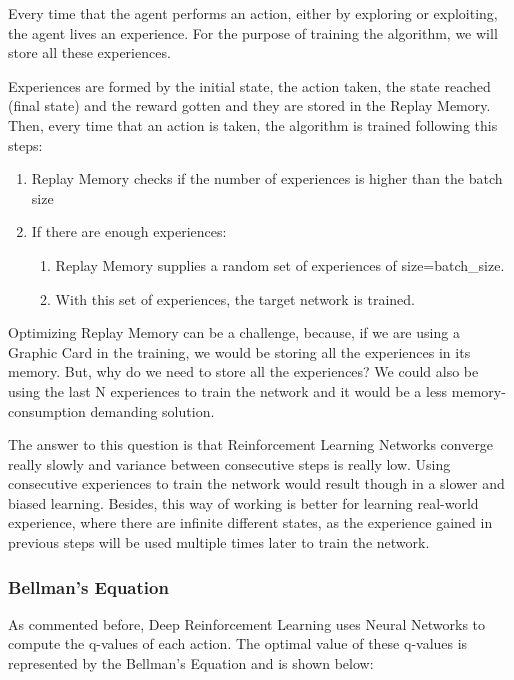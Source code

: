 			Every time that the agent performs an action, either by exploring or exploiting, the agent lives an experience. For the purpose of training the algorithm, we will store all these experiences.
			
			Experiences are formed by the initial state, the action taken, the state reached (final state) and the reward gotten and they are stored in the Replay Memory. Then, every time that an action is taken, the algorithm is trained following this steps:
			
			\begin{enumerate}
				\item Replay Memory checks if the number of experiences is higher than the batch size
				\item If there are enough experiences:
				\begin{enumerate}
					\item Replay Memory supplies a random set of experiences of size=batch\_size.
					\item With this set of experiences, the target network is trained.
				\end{enumerate}
			\end{enumerate}
			
			Optimizing Replay Memory can be a challenge, because, if we are using a Graphic Card in the training, we would be storing all the experiences in its memory. But, why do we need to store all the experiences? We could also be using the last N experiences to train the network and it would be a less memory-consumption demanding solution. 
			
			The answer to this question is that Reinforcement Learning Networks converge really slowly and variance between consecutive steps is really low. Using consecutive experiences to train the network would result though in a slower and biased learning. Besides, this way of working is better for learning real-world experience, where there are infinite different states, as the experience gained in previous steps will be used multiple times later to train the network.		


		\subsubsection{Bellman's Equation}
			As commented before, Deep Reinforcement Learning uses Neural Networks to compute the q-values of each action. The optimal value of these q-values is represented by the Bellman's Equation and is shown below:
			
